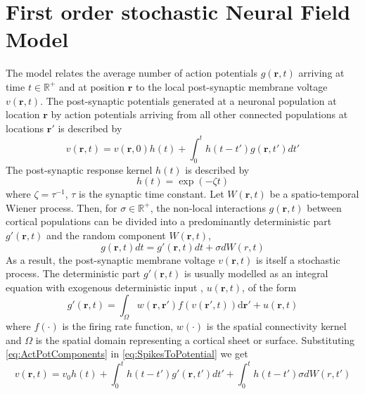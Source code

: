 \documentclass[a4paper,10pt]{article}
\begin{document}
\section{First order stochastic Neural Field Model}
The model relates the average number of action potentials $g(\mathbf{r},t)$
arriving at time $t \in \mathbb R^{+}$ and at position $\mathbf{r}$ to the local
post-synaptic membrane voltage $v(\mathbf{r},t)$. The post-synaptic potentials
generated at a neuronal population at location $\mathbf{r}$ by action potentials
arriving from all other connected populations at locations $\mathbf{r}'$ is
described by 
\begin{equation}
	\label{eq:SpikesToPotential} v\left( {\mathbf{r},t} \right)=v(\mathbf r,
0)h(t)+\int_0^t {h\left( {t - t'} \right)g\left( {\mathbf{r},t'} \right)dt'} 
\end{equation}
The post-synaptic response kernel $h(t)$ is described by 
\begin{equation}
	\label{eq:SynapticRespKernel} h(t) = \exp{\left(-\zeta t\right)} 
\end{equation}
where $\zeta=\tau^{-1}$, $\tau$ is the synaptic time constant.
Let $W(\mathbf r,t)$ be a spatio-temporal Wiener process. Then, for $\sigma \in
\mathbb R^{+}$, the non-local interactions $g\left( {\mathbf{r},t} \right)$
between cortical populations can be divided into a predominantly deterministic
part $g'\left( {\mathbf{r},t} \right) $ and  the random component $W(\mathbf
r,t)$,
\begin{equation}\label{eq:ActPotComponents}
  g\left( {\mathbf{r},t} \right)dt=g'\left( {\mathbf{r},t} \right)dt+\sigma d
W(r,t)
\end{equation}
As a result, the post-synaptic membrane voltage $v(\mathbf r, t)$ is itself a
stochastic process. The deterministic part $g'(\mathbf r, t)$ is usually
modelled as an integral equation with exogenous deterministic input , $
u(\mathbf r,t)$, of the form \cite{Atay2005}
\begin{equation}
	\label{DeterministicRateBasedInteractions} g'\left( \mathbf{r},t \right)
= \int_\Omega {w\left( \mathbf{r},\mathbf{r}' \right)f\left( v\left(
\mathbf{r}',t \right) \right)\textrm{d}\mathbf{r}'}+u(\mathbf r,t)
\end{equation}
where $f(\cdot)$ is the firing rate function, $w(\cdot)$ is the spatial
connectivity kernel and $\Omega$ is the spatial domain representing a cortical
sheet or surface. Substituting \eqref{eq:ActPotComponents} in
\eqref{eq:SpikesToPotential} we get
\begin{equation}\label{eq:NeuralModelDeterStoch}
v\left( {\mathbf{r},t} \right)=v_0h(t)+\int_0^t {h\left( {t - t'}
\right)g'\left( {\mathbf{r},t'} \right)dt'}+ \int_0^t h\left( {t - t'}
\right)\sigma d W(r,t')
\end{equation}
\end{document}
